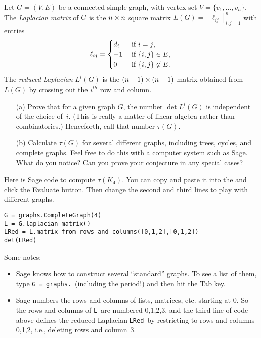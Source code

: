 \vfill\prob Let $G=(V,E)$ be a connected simple graph, with vertex set $V=\{v_1,\dots,v_n\}$.  The \emph{Laplacian matrix} of $G$ is the $n\times n$ square matrix $L(G)=[\ell_{ij}]_{i,j=1}^n$ with entries
\[\ell_{ij}=\begin{cases}{d_i}&\text{ if $i=j$,}\\{-1}&\text{ if $\{i,j\}\in E$,}\\{0}&\text{ if $\{i,j\}\not\in E$.}\end{cases}\]
The \emph{reduced Laplacian} $L^i(G)$ is the $(n-1)\times(n-1)$ matrix obtained from $L(G)$ by crossing out the $i^{th}$ row and column.
\begin{enumerate}
\item[(a)] Prove that for a given graph $G$, the number $\det L^i(G)$ is independent of the choice of~$i$.  (This is really a matter of linear algebra rather than combinatorics.)  Henceforth, call that number $\tau(G)$.  
\item[(b)] Calculate $\tau(G)$ for several different graphs, including trees, cycles, and complete graphs.  Feel free to do this with a computer system such as Sage.  What do you notice?  Can you prove your conjecture in any special cases?
\end{enumerate}
Here is Sage code to compute $\tau(K_4)$.  You can copy and paste it into the  and click the Evaluate button.  Then change the second and third lines to play with different graphs.

\pagebreak

\color{blue}
\begin{verbatim}
G = graphs.CompleteGraph(4)
L = G.laplacian_matrix()
LRed = L.matrix_from_rows_and_columns([0,1,2],[0,1,2])
det(LRed)
\end{verbatim}
\color{black}

Some notes:
\begin{itemize}
\item Sage knows how to construct several ``standard'' graphs.  To see a list of them, type \color{blue}\verb+G = graphs.+\color{black}\ (including the period!) and then hit the Tab key.
\item Sage numbers the rows and columns of lists, matrices, etc. starting at 0.  So the rows and columns of \color{blue}\verb+L+\color{black}\ are numbered 0,1,2,3, and the third line of code above defines the reduced Laplacian \color{blue}\verb+LRed+\color{black}\ by restricting to rows and columns 0,1,2, i.e., deleting rows and column~3.
\end{itemize}

